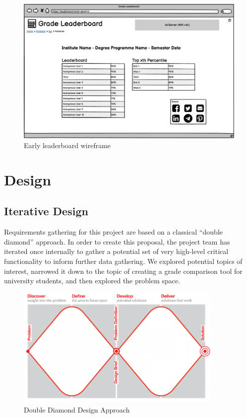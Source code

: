 \begin{figure}[H]
    \centering
    \includegraphics[width=\textwidth]{images/One course - Leaderboard v07.png}
    \caption{Early leaderboard wireframe}
    \label{fig:earlyleaderboardwireframe}
\end{figure}

\section{Design}
\subsection{Iterative Design}\label{sec:iterative_design}
Requirements gathering for this project are based on a classical ``double diamond'' approach. In order to create this proposal, the project team has iterated once internally to gather a potential set of very high-level critical functionality to inform further data gathering. We explored potential topics of interest, narrowed it down to the topic of creating a grade comparison tool for university students, and then explored the problem space.

\begin{figure}[H]
    \centering
    \includegraphics[width=10cm]{images/Double-Diamond-A3-for-publication-A-2000px_1.png}
    \caption{Double Diamond Design Approach}
    \label{fig:doublediamond}
\end{figure}

